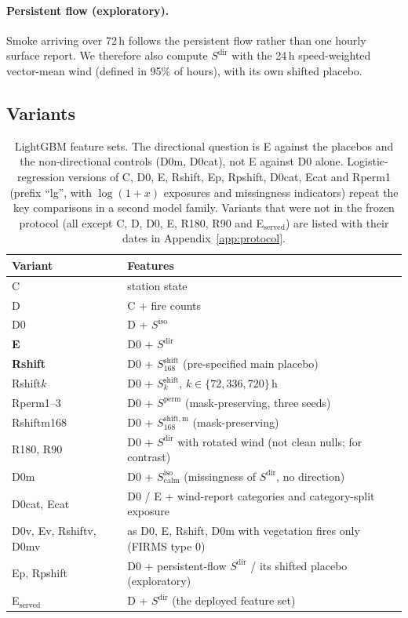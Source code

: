 \paragraph{Persistent flow (exploratory).}
Smoke arriving over 72\,h follows the persistent flow rather than one hourly surface report. We
therefore also compute $S^{\mathrm{dir}}$ with the 24\,h speed-weighted vector-mean wind (defined
in 95\% of hours), with its own shifted placebo.

\subsection{Variants}

\begin{table}[h]
\centering
\small
\begin{tabular}{ll}
\toprule
Variant & Features \\
\midrule
C & station state \\
D & C + fire counts \\
D0 & D + $S^{\mathrm{iso}}$ \\
\textbf{E} & D0 + $S^{\mathrm{dir}}$ \\
\textbf{Rshift} & D0 + $S^{\mathrm{shift}}_{168}$ (pre-specified main placebo) \\
Rshift$k$ & D0 + $S^{\mathrm{shift}}_k$, $k\in\{72,336,720\}$\,h \\
Rperm1--3 & D0 + $S^{\mathrm{perm}}$ (mask-preserving, three seeds) \\
Rshiftm168 & D0 + $S^{\mathrm{shift,m}}_{168}$ (mask-preserving) \\
R180, R90 & D0 + $S^{\mathrm{dir}}$ with rotated wind (not clean nulls; for contrast) \\
D0m & D0 + $S^{\mathrm{iso}}_{\mathrm{calm}}$ (missingness of $S^{\mathrm{dir}}$, no direction) \\
D0cat, Ecat & D0 / E + wind-report categories and category-split exposure \\
D0v, Ev, Rshiftv, D0mv & as D0, E, Rshift, D0m with vegetation fires only (FIRMS type 0) \\
Ep, Rpshift & D0 + persistent-flow $S^{\mathrm{dir}}$ / its shifted placebo (exploratory) \\
E$_\text{served}$ & D + $S^{\mathrm{dir}}$ (the deployed feature set) \\
\bottomrule
\end{tabular}
\caption{LightGBM feature sets. The directional question is E against the placebos and the
non-directional controls (D0m, D0cat), not E against D0 alone. Logistic-regression versions of C,
D0, E, Rshift, Ep, Rpshift, D0cat, Ecat and Rperm1 (prefix ``lg'', with $\log(1+x)$ exposures and
missingness indicators) repeat the key comparisons in a second model family. Variants that were
not in the frozen protocol (all except C, D, D0, E, R180, R90 and E$_\text{served}$) are listed
with their dates in Appendix~\ref{app:protocol}.}
\label{tab:variants}
\end{table}

